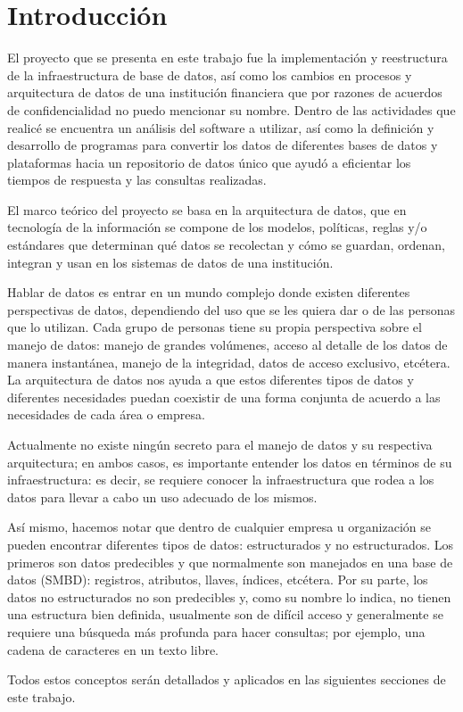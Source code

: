 \chapter{Introducción}
\label{cap:introduccion}

El proyecto que se presenta en este trabajo fue la implementación y reestructura
de la infraestructura de base de datos, así como los cambios en procesos y
arquitectura de datos de una institución financiera que por razones de acuerdos
de confidencialidad no puedo mencionar su nombre. Dentro de las actividades que
realicé se encuentra un análisis del software a utilizar, así como la definición
y desarrollo de programas para convertir los datos de diferentes bases de datos
y plataformas hacia un repositorio de datos único que ayudó a eficientar los
tiempos de respuesta y las consultas realizadas.

El marco teórico del proyecto se basa en la arquitectura de datos, que en
tecnología de la información se compone de los modelos, políticas, reglas y/o
estándares que determinan qué datos se recolectan y cómo se guardan, ordenan,
integran y usan en los sistemas de datos de una institución.

Hablar de datos es entrar en un mundo complejo donde existen diferentes
perspectivas de datos, dependiendo del uso que se les quiera dar o de las
personas que lo utilizan. Cada grupo de personas tiene su propia perspectiva
sobre el manejo de datos: manejo de grandes volúmenes, acceso al detalle de los
datos de manera instantánea, manejo de la integridad, datos de acceso exclusivo,
etcétera. La arquitectura de datos nos ayuda a que estos diferentes tipos de
datos y diferentes necesidades puedan coexistir de una forma conjunta de acuerdo
a las necesidades de cada área o empresa.

Actualmente no existe ningún secreto para el manejo de datos y su respectiva
arquitectura; en ambos casos, es importante entender los datos en términos de su
infraestructura: es decir, se requiere conocer la infraestructura que rodea a
los datos para llevar a cabo un uso adecuado de los mismos.

Así mismo, hacemos notar que dentro de cualquier empresa u organización se
pueden encontrar diferentes tipos de datos: estructurados y no
estructurados. Los primeros son datos predecibles y que normalmente son
manejados en una base de datos (SMBD): registros, atributos, llaves, índices,
etcétera. Por su parte, los datos no estructurados no son predecibles y, como su
nombre lo indica, no tienen una estructura bien definida, usualmente son de
difícil acceso y generalmente se requiere una búsqueda más profunda para hacer
consultas; por ejemplo, una cadena de caracteres en un texto libre.

Todos estos conceptos serán detallados y aplicados en las siguientes secciones de este trabajo.

\cleardoublepage

